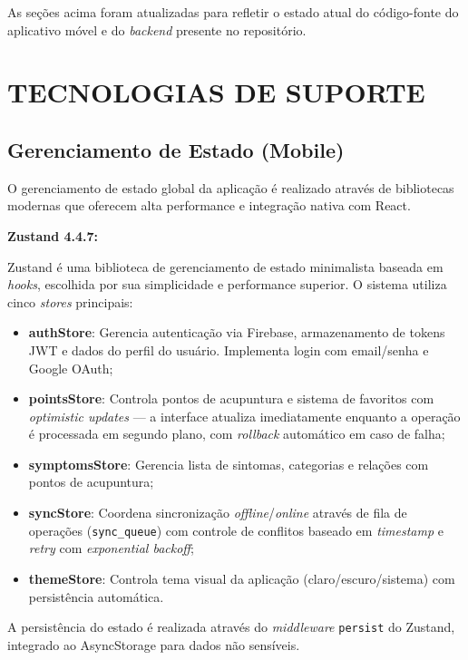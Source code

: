 As seções acima foram atualizadas para refletir o estado atual do código-fonte do aplicativo móvel e do \textit{backend} presente no repositório.

\section{TECNOLOGIAS DE SUPORTE} \label{sec:suporte}

\subsection{Gerenciamento de Estado (Mobile)}

O gerenciamento de estado global da aplicação é realizado através de bibliotecas modernas que oferecem alta performance e integração nativa com React.

\textbf{Zustand 4.4.7:}

Zustand é uma biblioteca de gerenciamento de estado minimalista baseada em \textit{hooks}, escolhida por sua simplicidade e performance superior. O sistema utiliza cinco \textit{stores} principais:

\begin{itemize}
    \item \textbf{authStore}: Gerencia autenticação via Firebase, armazenamento de tokens JWT e dados do perfil do usuário. Implementa login com email/senha e Google OAuth;
    \item \textbf{pointsStore}: Controla pontos de acupuntura e sistema de favoritos com \textit{optimistic updates} --- a interface atualiza imediatamente enquanto a operação é processada em segundo plano, com \textit{rollback} automático em caso de falha;
    \item \textbf{symptomsStore}: Gerencia lista de sintomas, categorias e relações com pontos de acupuntura;
    \item \textbf{syncStore}: Coordena sincronização \textit{offline}/\textit{online} através de fila de operações (\texttt{sync\_queue}) com controle de conflitos baseado em \textit{timestamp} e \textit{retry} com \textit{exponential backoff};
    \item \textbf{themeStore}: Controla tema visual da aplicação (claro/escuro/sistema) com persistência automática.
\end{itemize}

A persistência do estado é realizada através do \textit{middleware} \texttt{persist} do Zustand, integrado ao AsyncStorage para dados não sensíveis.

